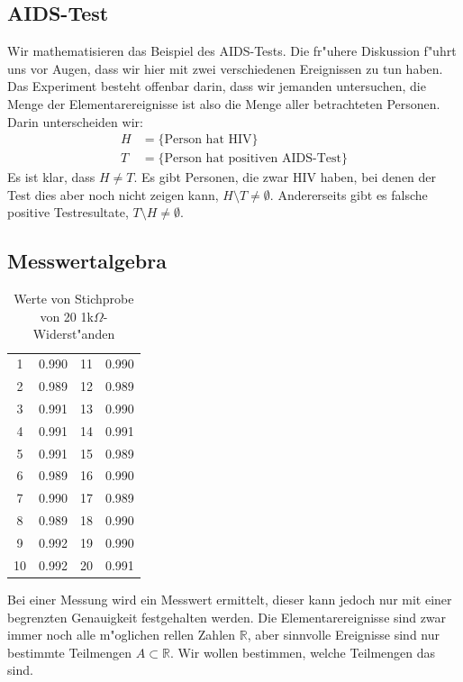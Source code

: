 \subsection{AIDS-Test}
Wir mathematisieren das Beispiel des AIDS-Tests.
Die fr"uhere Diskussion f"uhrt uns vor Augen,
dass wir hier mit zwei verschiedenen Ereignissen zu tun haben. 
Das Experiment besteht offenbar darin, dass wir jemanden untersuchen,
die Menge der Elementarereignisse ist also die Menge aller betrachteten
Personen.
Darin unterscheiden wir:
\begin{align*}
H&=\{\text{Person hat HIV}\}\\
T&=\{\text{Person hat positiven AIDS-Test}\}
\end{align*}
Es ist klar, dass $H\ne T$. Es gibt Personen, die zwar HIV haben, bei
denen der Test dies aber noch nicht zeigen kann, $H\setminus T\ne \emptyset$.
Andererseits gibt es falsche positive Testresultate,
$T\setminus H\ne\emptyset$. 

\subsection{Messwertalgebra}
\begin{table}
\begin{center}
\begin{tabular}{|cc|cc|}
\hline
1&0.990
&11&0.990\\
2&0.989
&12&0.989\\
3&0.991
&13&0.990\\
4&0.991
&14&0.991\\
5&0.991
&15&0.989\\
6&0.989
&16&0.990\\
7&0.990
&17&0.989\\
8&0.989
&18&0.990\\
9&0.992
&19&0.990\\
10&0.992
&20&0.991\\
\hline
\end{tabular}
\end{center}
\caption{Werte von Stichprobe von 20 1k$\Omega$-Widerst"anden\label{widerstandswerte}}
\end{table}
Bei einer Messung wird ein Messwert ermittelt, dieser kann jedoch
nur mit einer begrenzten Genauigkeit festgehalten werden.
Die Elementarereignisse sind zwar immer noch alle m"oglichen rellen
Zahlen $\mathbb R$, aber sinnvolle Ereignisse sind nur bestimmte Teilmengen
$A\subset\mathbb R$. Wir wollen bestimmen, welche Teilmengen das sind.

